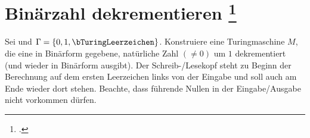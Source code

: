 \documentclass{bschlangaul-aufgabe}
\begin{document}
\let\t=\bTuringUebergangZelle

\section{Binärzahl dekrementieren
\footcite[Aufgabe 3]{theo:ab:3}}

Sei  und $\Gamma = \{ 0, 1, \bTuringLeerzeichen \}$.
Konstruiere eine Turingmaschine $M$, die eine in Binärform gegebene,
natürliche Zahl $(\neq 0)$ um $1$ dekrementiert (und wieder in Binärform
ausgibt). Der Schreib-/Lesekopf steht zu Beginn der Berechnung auf dem
ersten Leerzeichen links von der Eingabe und soll auch am Ende wieder
dort stehen. Beachte, dass führende Nullen in der Eingabe/Ausgabe nicht
vorkommen dürfen.
\end{document}
